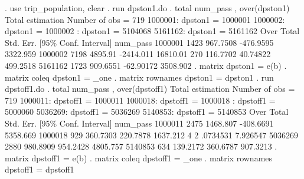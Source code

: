 . use trip_population, clear
{\smallskip}
. run dpston1.do
{\smallskip}
. total num_pass , over(dpston1)
{\smallskip}
Total estimation                  Number of obs   =        719
{\smallskip}
      1000001: dpston1 = 1000001
      1000002: dpston1 = 1000002
\smallskip
\oom
{}: dpston1 = 5104068
      5161162: dpston1 = 5161162
{\smallskip}
        Over {\VBAR}      Total   Std. Err.     [95\% Conf. Interval]
num_pass     {\VBAR}
     1000001 {\VBAR}       1423   967.7508     -476.9595    3322.959
     1000002 {\VBAR}       7198    4895.91     -2414.011    16810.01
\smallskip
\oom
{} {\VBAR}        270   116.7702      40.74822    499.2518
     5161162 {\VBAR}       1723   909.6551     -62.90172    3508.902
{\smallskip}
. matrix dpston1 = e(b)
{\smallskip}
. matrix coleq dpston1 = _one
{\smallskip}
. matrix rownames dpston1 = dpston1
{\smallskip}
. run dpstoff1.do
\cnp
. total num_pass , over(dpstoff1)
{\smallskip}
Total estimation                  Number of obs   =        719
{\smallskip}
      1000011: dpstoff1 = 1000011
      1000018: dpstoff1 = 1000018
\smallskip
\oom
{}: dpstoff1 = 5000060
      5036269: dpstoff1 = 5036269
      5140853: dpstoff1 = 5140853
{\smallskip}
        Over {\VBAR}      Total   Std. Err.     [95\% Conf. Interval]
num_pass     {\VBAR}
     1000011 {\VBAR}       2475   1468.807     -408.6691    5358.669
     1000018 {\VBAR}        929   360.7303      220.7878    1637.212
\smallskip
\oom
{} {\VBAR}          4          2      .0734531    7.926547
     5036269 {\VBAR}       2880   980.8909      954.2428    4805.757
     5140853 {\VBAR}        634   139.2172      360.6787    907.3213
{\smallskip}
. matrix dpstoff1 = e(b)
{\smallskip}
. matrix coleq dpstoff1 = _one
{\smallskip}
. matrix rownames dpstoff1 = dpstoff1
{\smallskip}

